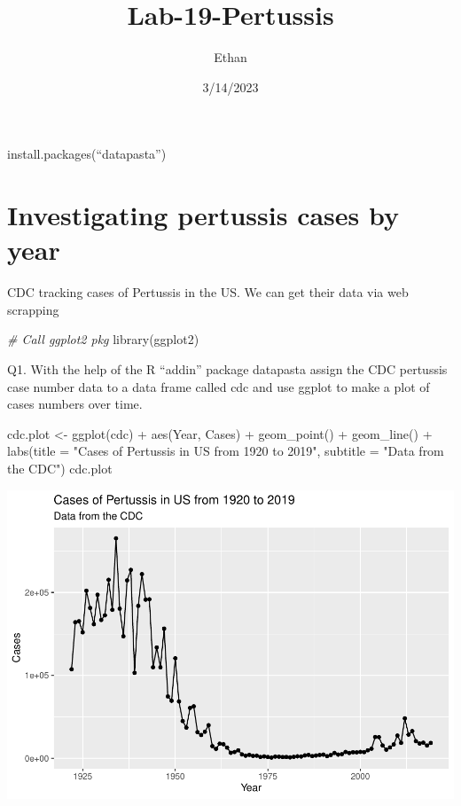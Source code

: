 \documentclass[
]{article}
\title{Lab-19-Pertussis}
\author{Ethan}
\date{3/14/2023}
\newenvironment{Shaded}{\begin{snugshade}}{\end{snugshade}}
\newcommand{\AttributeTok}[1]{\textcolor[rgb]{0.77,0.63,0.00}{#1}}
\newcommand{\CommentTok}[1]{\textcolor[rgb]{0.56,0.35,0.01}{\textit{#1}}}
\newcommand{\FunctionTok}[1]{\textcolor[rgb]{0.00,0.00,0.00}{#1}}
\newcommand{\NormalTok}[1]{#1}
\newcommand{\OtherTok}[1]{\textcolor[rgb]{0.56,0.35,0.01}{#1}}
\newcommand{\SpecialCharTok}[1]{\textcolor[rgb]{0.00,0.00,0.00}{#1}}
\newcommand{\StringTok}[1]{\textcolor[rgb]{0.31,0.60,0.02}{#1}}
\begin{document}
\maketitle

install.packages(``datapasta'')

\hypertarget{investigating-pertussis-cases-by-year}{%
\section{Investigating pertussis cases by
year}\label{investigating-pertussis-cases-by-year}}

CDC tracking cases of Pertussis in the US. We can get their data via web
scrapping

\begin{Shaded}
\begin{Highlighting}[]
\CommentTok{\# Call ggplot2 pkg}
\FunctionTok{library}\NormalTok{(ggplot2)}
\end{Highlighting}
\end{Shaded}

Q1. With the help of the R ``addin'' package datapasta assign the CDC
pertussis case number data to a data frame called cdc and use ggplot to
make a plot of cases numbers over time.

\begin{Shaded}
\begin{Highlighting}[]
\NormalTok{cdc.plot }\OtherTok{\textless{}{-}} \FunctionTok{ggplot}\NormalTok{(cdc) }\SpecialCharTok{+}
  \FunctionTok{aes}\NormalTok{(Year, Cases) }\SpecialCharTok{+}
  \FunctionTok{geom\_point}\NormalTok{() }\SpecialCharTok{+}
  \FunctionTok{geom\_line}\NormalTok{() }\SpecialCharTok{+}
  \FunctionTok{labs}\NormalTok{(}\AttributeTok{title =} \StringTok{"Cases of Pertussis in US from 1920 to 2019"}\NormalTok{,}
       \AttributeTok{subtitle =} \StringTok{"Data from the CDC"}\NormalTok{)}
\NormalTok{cdc.plot}
\end{Highlighting}
\end{Shaded}

\includegraphics{lab-19-143_files/figure-latex/unnamed-chunk-3-1.pdf}
\end{document}
